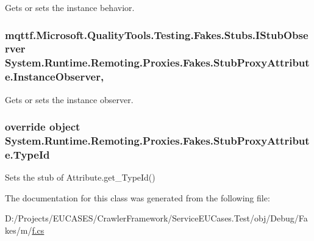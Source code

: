 Gets or sets the instance behavior.

\hypertarget{class_system_1_1_runtime_1_1_remoting_1_1_proxies_1_1_fakes_1_1_stub_proxy_attribute_a019ccb7b64adc9671ebc3e51cd3e7f78}{
\subsubsection[{Instance\-Observer}]{\setlength{\rightskip}{0pt plus 5cm}mqttf.\-Microsoft.\-Quality\-Tools.\-Testing.\-Fakes.\-Stubs.\-I\-Stub\-Observer System.\-Runtime.\-Remoting.\-Proxies.\-Fakes.\-Stub\-Proxy\-Attribute.\-Instance\-Observer\hspace{0.3cm}{\ttfamily [get]}, {\ttfamily [set]}}}\label{class_system_1_1_runtime_1_1_remoting_1_1_proxies_1_1_fakes_1_1_stub_proxy_attribute_a019ccb7b64adc9671ebc3e51cd3e7f78}


Gets or sets the instance observer.

\hypertarget{class_system_1_1_runtime_1_1_remoting_1_1_proxies_1_1_fakes_1_1_stub_proxy_attribute_afdda7c90e65c2b47ec826823de4e3652}{
\subsubsection[{Type\-Id}]{\setlength{\rightskip}{0pt plus 5cm}override object System.\-Runtime.\-Remoting.\-Proxies.\-Fakes.\-Stub\-Proxy\-Attribute.\-Type\-Id\hspace{0.3cm}{\ttfamily [get]}}}\label{class_system_1_1_runtime_1_1_remoting_1_1_proxies_1_1_fakes_1_1_stub_proxy_attribute_afdda7c90e65c2b47ec826823de4e3652}


Sets the stub of Attribute.\-get\-\_\-\-Type\-Id()



The documentation for this class was generated from the following file\-:\begin{DoxyCompactItemize}
\item 
D\-:/\-Projects/\-E\-U\-C\-A\-S\-E\-S/\-Crawler\-Framework/\-Service\-E\-U\-Cases.\-Test/obj/\-Debug/\-Fakes/m/\hyperlink{m_2f_8cs}{f.\-cs}\end{DoxyCompactItemize}
